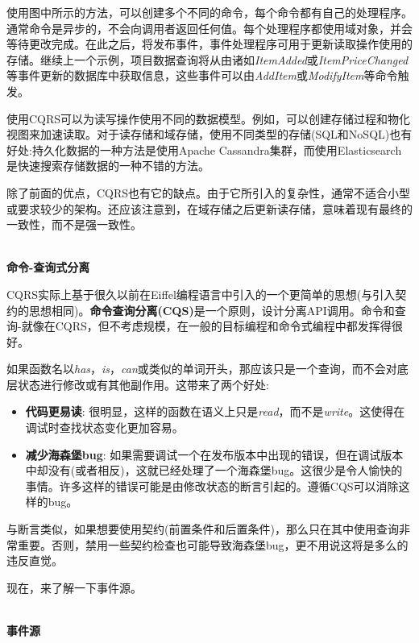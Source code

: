 使用图中所示的方法，可以创建多个不同的命令，每个命令都有自己的处理程序。通常命令是异步的，不会向调用者返回任何值。每个处理程序都使用域对象，并会等待更改完成。在此之后，将发布事件，事件处理程序可用于更新读取操作使用的存储。继续上一个示例，项目数据查询将从由诸如\textit{ItemAdded}或\textit{ItemPriceChanged}等事件更新的数据库中获取信息，这些事件可以由\textit{AddItem}或\textit{ModifyItem}等命令触发。

使用CQRS可以为读写操作使用不同的数据模型。例如，可以创建存储过程和物化视图来加速读取。对于读存储和域存储，使用不同类型的存储(SQL和NoSQL)也有好处:持久化数据的一种方法是使用Apache Cassandra集群，而使用Elasticsearch是快速搜索存储数据的一种不错的方法。

除了前面的优点，CQRS也有它的缺点。由于它所引入的复杂性，通常不适合小型或要求较少的架构。还应该注意到，在域存储之后更新读存储，意味着现有最终的一致性，而不是强一致性。

\hspace*{\fill} \\ %
\noindent
\textbf{命令-查询式分离}

CQRS实际上基于很久以前在Eiffel编程语言中引入的一个更简单的思想(与引入契约的思想相同)。\textbf{命令查询分离(CQS)}是一个原则，设计分离API调用。命令和查询-就像在CQRS，但不考虑规模，在一般的目标编程和命令式编程中都发挥得很好。

如果函数名以\textit{has}，\textit{is}，\textit{can}或类似的单词开头，那应该只是一个查询，而不会对底层状态进行修改或有其他副作用。这带来了两个好处:

\begin{itemize}
\item 
\textbf{代码更易读}: 很明显，这样的函数在语义上只是\textit{read}，而不是\textit{write}。这使得在调试时查找状态变化更加容易。

\item 
\textbf{减少海森堡bug}: 如果需要调试一个在发布版本中出现的错误，但在调试版本中却没有(或者相反)，这就已经处理了一个海森堡bug。这很少是令人愉快的事情。许多这样的错误可能是由修改状态的断言引起的。遵循CQS可以消除这样的bug。
\end{itemize}

与断言类似，如果想要使用契约(前置条件和后置条件)，那么只在其中使用查询非常重要。否则，禁用一些契约检查也可能导致海森堡bug，更不用说这将是多么的违反直觉。

现在，来了解一下事件源。

\hspace*{\fill} \\ %
\noindent
\textbf{事件源}

